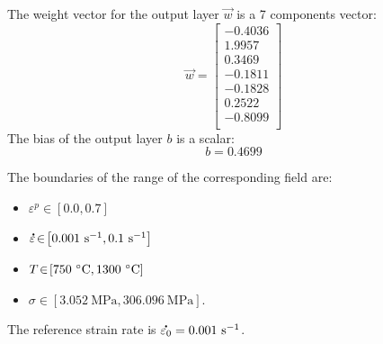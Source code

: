 \documentclass[algorithms,article,submit,pdftex,moreauthors]{Definitions/mdpi}
\DeclareRobustCommand{\mdot}[1]{\accentset{\mbox{\bfseries .}}{#1}}
\DeclareRobustCommand{\ps}{\text{s}^{-1}}
\DeclareRobustCommand{\MPa}{\text{MPa}}
\begin{document}
The weight vector for the output layer $\overrightarrow{w}$ is a 7 components vector:
\begin{equation*}
\overrightarrow{w} = \left[
\begin{array}{r}
-0.4036\\
1.9957\\
0.3469\\
-0.1811\\
-0.1828\\
0.2522\\
-0.8099\\
\end{array}\right]
\end{equation*}
The bias of the output layer $b$ is a scalar:
\begin{equation*}
b = 0.4699
\end{equation*}

The boundaries of the range of the corresponding field are:
\begin{itemize}
\item $\varepsilon^p\!\in\!\left[0.0,0.7\right]$
\item $\mdot{\varepsilon}\!\in\!\left[0.001~\ps,0.1~\ps\right]$
\item $T\!\in\!\left[750~\celsius,1300~\celsius\right]$
\item $\sigma\!\in\!\left[3.052~\MPa,306.096~\MPa\right]$.
\end{itemize}
The reference strain rate is $\mdot{\varepsilon_0} = 0.001~\ps$.








%


\end{document}
